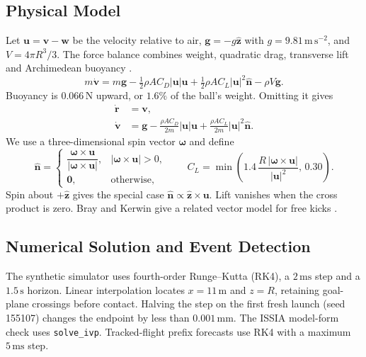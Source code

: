 \documentclass[11pt,a4paper]{article}
\begin{document}
\subsection{Physical Model}
\label{sec:forces}

Let $\mathbf u=\mathbf v-\mathbf w$ be the velocity relative to air, $\mathbf g=-g\hat{\mathbf z}$ with $g=9.81\,\mathrm{m\,s^{-2}}$, and $V=4\pi R^3/3$. The force balance combines weight, quadratic drag, transverse lift and Archimedean buoyancy \cite{nasaforces,nasadrag,nasalift,archimedes}.
\begin{equation}
  m\dot{\mathbf v}=m\mathbf g-\tfrac12\rho A C_D|\mathbf u|\mathbf u
  +\tfrac12\rho A C_L|\mathbf u|^2\hat{\mathbf n}-\rho V\mathbf g.
  \label{eq:full}
\end{equation}
Buoyancy is $0.066\,\mathrm{N}$ upward, or $1.6\%$ of the ball's weight. Omitting it gives
\begin{align}
  \dot{\mathbf r}&=\mathbf v,\label{eq:kin}\\
  \dot{\mathbf v}&=\mathbf g-\frac{\rho A C_D}{2m}|\mathbf u|\mathbf u
    +\frac{\rho A C_L}{2m}|\mathbf u|^2\hat{\mathbf n}.\label{eq:dyn}
\end{align}
We use a three-dimensional spin vector $\boldsymbol\omega$ and define
\begin{equation}
  \hat{\mathbf{n}}=
  \begin{cases}
    \dfrac{\boldsymbol{\omega}\times\mathbf{u}}{|\boldsymbol{\omega}\times\mathbf{u}|}, & |\boldsymbol{\omega}\times\mathbf{u}|>0,\\[2mm]
    \mathbf{0}, & \text{otherwise},
  \end{cases}
  \qquad
  C_L=\min\!\left(1.4\,\frac{R\,|\boldsymbol{\omega}\times\mathbf{u}|}{|\mathbf{u}|^2},\,0.30\right).
  \label{eq:lift}
\end{equation}
Spin about $+\hat{\mathbf z}$ gives the special case $\hat{\mathbf n}\propto\hat{\mathbf z}\times\mathbf u$. Lift vanishes when the cross product is zero. Bray and Kerwin give a related vector model for free kicks \cite{bray2003}.

\subsection{Numerical Solution and Event Detection}

The synthetic simulator uses fourth-order Runge--Kutta (RK4), a $2\,\mathrm{ms}$ step and a $1.5\,\mathrm{s}$ horizon. Linear interpolation locates $x=11\,\mathrm{m}$ and $z=R$, retaining goal-plane crossings before contact. Halving the step on the first fresh launch (seed 155107) changes the endpoint by less than $0.001\,\mathrm{mm}$. The ISSIA model-form check uses \texttt{solve\_ivp}. Tracked-flight prefix forecasts use RK4 with a maximum $5\,\mathrm{ms}$ step.
\end{document}
